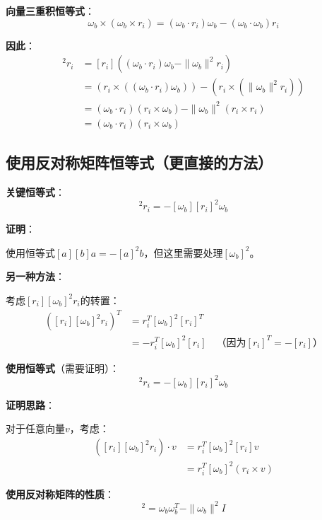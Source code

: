 \documentclass[12pt,a4paper]{article}
\begin{document}
\textbf{向量三重积恒等式}：
\begin{equation}
\omega_b \times (\omega_b \times r_i) = (\omega_b \cdot r_i) \omega_b - (\omega_b \cdot \omega_b) r_i
\end{equation}

\textbf{因此}：
\begin{align}
[r_i][\omega_b]^2 r_i &= [r_i]((\omega_b \cdot r_i) \omega_b - \|\omega_b\|^2 r_i) \\
&= (r_i \times ((\omega_b \cdot r_i) \omega_b)) - (r_i \times (\|\omega_b\|^2 r_i)) \\
&= (\omega_b \cdot r_i)(r_i \times \omega_b) - \|\omega_b\|^2 (r_i \times r_i) \\
&= (\omega_b \cdot r_i)(r_i \times \omega_b)
\end{align}

\subsection{使用反对称矩阵恒等式（更直接的方法）}

\textbf{关键恒等式}：
\begin{equation}
[r_i][\omega_b]^2 r_i = -[\omega_b][r_i]^2 \omega_b
\end{equation}

\textbf{证明}：

使用恒等式$[a][b] a = -[a]^2 b$，但这里需要处理$[\omega_b]^2$。

\textbf{另一种方法}：

考虑$[r_i][\omega_b]^2 r_i$的转置：
\begin{align}
([r_i][\omega_b]^2 r_i)^T &= r_i^T [\omega_b]^2 [r_i]^T \\
&= -r_i^T [\omega_b]^2 [r_i] \quad \text{（因为$[r_i]^T = -[r_i]$）}
\end{align}

\textbf{使用恒等式}（需要证明）：
\begin{equation}
[r_i][\omega_b]^2 r_i = -[\omega_b][r_i]^2 \omega_b
\end{equation}

\textbf{证明思路}：

对于任意向量$v$，考虑：
\begin{align}
([r_i][\omega_b]^2 r_i) \cdot v &= r_i^T [\omega_b]^2 [r_i] v \\
&= r_i^T [\omega_b]^2 (r_i \times v)
\end{align}

\textbf{使用反对称矩阵的性质}：
\begin{equation}
[\omega_b]^2 = \omega_b \omega_b^T - \|\omega_b\|^2 I
\end{equation}
\end{document}

